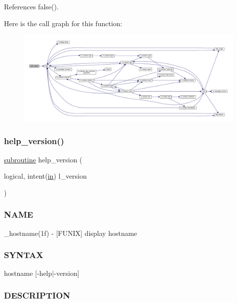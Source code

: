References false().

Here is the call graph for this function\+:
\nopagebreak
\begin{figure}[H]
\begin{center}
\leavevmode
\includegraphics[width=350pt]{__hostname_8f90_a3e09a3b52ee8fb04eeb93fe5761626a8_cgraph}
\end{center}
\end{figure}
\mbox{\label{__hostname_8f90_a39c21619b08a3c22f19e2306efd7f766}} 
\subsubsection{\texorpdfstring{help\+\_\+version()}{help\_version()}}
{\footnotesize\ttfamily \hyperlink{M__stopwatch_83_8txt_acfbcff50169d691ff02d4a123ed70482}{subroutine} help\+\_\+version (\begin{DoxyParamCaption}\item[{logical, intent(\hyperlink{M__journal_83_8txt_afce72651d1eed785a2132bee863b2f38}{in})}]{l\+\_\+version }\end{DoxyParamCaption})}



\subsubsection*{N\+A\+ME}

\+\_\+hostname(1f) -\/ \mbox{[}F\+U\+N\+IX\mbox{]} display hostname \subsubsection*{S\+Y\+N\+T\+AX}

hostname \mbox{[}-\/help$\vert$-\/version\mbox{]} \subsubsection*{D\+E\+S\+C\+R\+I\+P\+T\+I\+ON}

